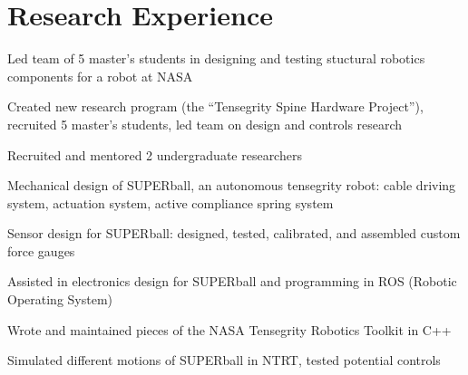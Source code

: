 \documentclass[letterpaper]{deedy-resume} %
\begin{document}
\newpage %
\begin{minipage}[t]{1\textwidth}%
\section{Research Experience}

\vspace{0.4cm}


\vspace{\topsep} %
\begin{tightitemize}
\item Led team of 5 master's students in designing and testing stuctural robotics components for a robot at NASA
\item Created new research program (the ``Tensegrity Spine Hardware Project''), recruited 5 master's students, led team on design and controls research
\item Recruited and mentored 2 undergraduate researchers
\end{tightitemize}

\sectionspace %



\begin{tightitemize}
\item Mechanical design of SUPERball, an autonomous tensegrity robot: cable driving system, actuation system, active compliance spring system
\item Sensor design for SUPERball: designed, tested, calibrated, and assembled custom force gauges
\item Assisted in electronics design for SUPERball and programming in ROS (Robotic Operating System)
\item Wrote and maintained pieces of the NASA Tensegrity Robotics Toolkit in C++
\item Simulated different motions of SUPERball in NTRT, tested potential controls
\end{tightitemize}


\end{minipage}
\end{document}
